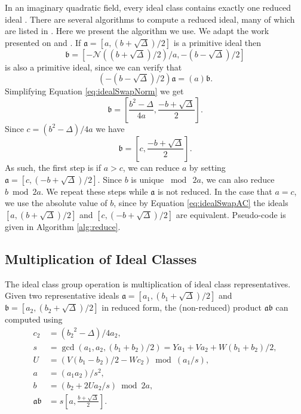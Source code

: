 \documentclass{ucalgthes1}
\theoremstyle{plain}
\theoremstyle{definition}
\begin{document}
In an imaginary quadratic field, every ideal class contains exactly one reduced ideal \cite[p.20]{Ramachandran2006}.  There are several algorithms to compute a reduced ideal, many of which are listed in \cite{Jacobson2006}.  Here we present the algorithm we use.  We adapt the work presented on \cite[p.90]{Jacobson2006} and \cite[p.99]{Jacobson2009}. If $\mathfrak a = [a, (b + \sqrt\Delta)/2]$ is a primitive ideal then 
\begin{equation}
\label{eq:idealSwapNorm}
	\mathfrak b = \left[ -\mathcal N((b + \sqrt\Delta)/2)/a, -(b - \sqrt\Delta)/2 \right]
\end{equation}
is also a primitive ideal, since we can verify that
\[
	\left(-(b - \sqrt\Delta)/2 \right) \mathfrak a = (a) \mathfrak b.
\]
Simplifying Equation \ref{eq:idealSwapNorm} we get
\[
	\mathfrak b = \left[ \frac{b^2-\Delta}{4a}, \frac{-b + \sqrt\Delta}{2} \right].
\]
Since $c = (b^2 - \Delta)/4a$ we have
\begin{equation}
\label{eq:idealSwapAC}
	\mathfrak b = \left[ c, \frac{-b + \sqrt\Delta}{2} \right].
\end{equation}
As such, the first step is if $a > c$, we can reduce $a$ by setting $\mathfrak a = [c, (-b + \sqrt\Delta)/2]$.  Since $b$ is unique $\bmod{~2a}$, we can also reduce $b \bmod{2a}$.  We repeat these steps while $\mathfrak a$ is not reduced.  In the case that $a = c$, we use the absolute value of $b$, since by Equation \ref{eq:idealSwapAC} the ideals $[a, (b + \sqrt\Delta)/2]$ and $[c, (-b+\sqrt\Delta)/2]$ are equivalent.  Pseudo-code is given in Algorithm \ref{alg:reduce}.


\subsection{Multiplication of Ideal Classes}
\label{subsec:idealMultiply}

The ideal class group operation is multiplication of ideal class representatives. Given two representative ideals $\mathfrak a = [a_1, (b_1 + \sqrt{\Delta})/2]$ and $\mathfrak b = [a_2, (b_2 + \sqrt{\Delta})/2]$ in reduced form, the (non-reduced) product $\mathfrak a \mathfrak b$ can computed using
\begin{align}
	c_2 & = ({b_2}^2-\Delta)/4a_2, \\
	s & = \gcd(a_1, a_2, (b_1+b_2)/2) = Ya_1 + Va_2 + W(b_1+b_2)/2,    \label{eq:idealProductS} \\
	U & = (V(b_1-b_2)/2 - Wc_2) \bmod{(a_1/s)},                        \label{eq:idealProductU} \\
	a & = (a_1a_2)/s^2,                                                \label{eq:idealProductA} \\
	b & = (b_2 + 2Ua_2/s) \bmod{2a},                                   \label{eq:idealProductB} \\
	\mathfrak a \mathfrak b & = s\left[a, \frac{b + \sqrt{\Delta}}{2}\right].
\end{align}
\end{document}
